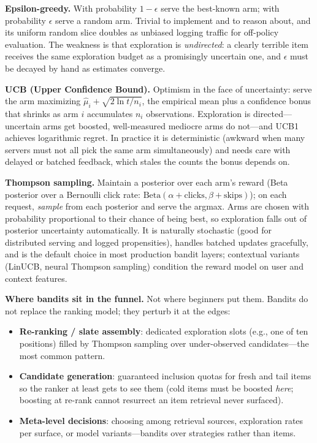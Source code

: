 \textbf{Epsilon-greedy.} With probability $1-\epsilon$ serve the best-known arm; with probability $\epsilon$ serve a random arm. Trivial to implement and to reason about, and its uniform random slice doubles as unbiased logging traffic for off-policy evaluation. The weakness is that exploration is \textit{undirected}: a clearly terrible item receives the same exploration budget as a promisingly uncertain one, and $\epsilon$ must be decayed by hand as estimates converge.

\textbf{UCB (Upper Confidence Bound).} Optimism in the face of uncertainty: serve the arm maximizing $\hat{\mu}_i + \sqrt{2\ln t / n_i}$, the empirical mean plus a confidence bonus that shrinks as arm $i$ accumulates $n_i$ observations. Exploration is directed---uncertain arms get boosted, well-measured mediocre arms do not---and UCB1 achieves logarithmic regret. In practice it is deterministic (awkward when many servers must not all pick the same arm simultaneously) and needs care with delayed or batched feedback, which stales the counts the bonus depends on.

\textbf{Thompson sampling.} Maintain a posterior over each arm's reward (Beta posterior over a Bernoulli click rate: $\text{Beta}(\alpha + \text{clicks}, \beta + \text{skips})$); on each request, \textit{sample} from each posterior and serve the argmax. Arms are chosen with probability proportional to their chance of being best, so exploration falls out of posterior uncertainty automatically. It is naturally stochastic (good for distributed serving and logged propensities), handles batched updates gracefully, and is the default choice in most production bandit layers; contextual variants (LinUCB, neural Thompson sampling) condition the reward model on user and context features.

\textbf{Where bandits sit in the funnel.} Not where beginners put them. Bandits do not replace the ranking model; they perturb it at the edges:
\begin{itemize}
    \item \textbf{Re-ranking / slate assembly}: dedicated exploration slots (e.g., one of ten positions) filled by Thompson sampling over under-observed candidates---the most common pattern.
    \item \textbf{Candidate generation}: guaranteed inclusion quotas for fresh and tail items so the ranker at least gets to see them (cold items must be boosted \textit{here}; boosting at re-rank cannot resurrect an item retrieval never surfaced).
    \item \textbf{Meta-level decisions}: choosing among retrieval sources, exploration rates per surface, or model variants---bandits over strategies rather than items.
\end{itemize}

